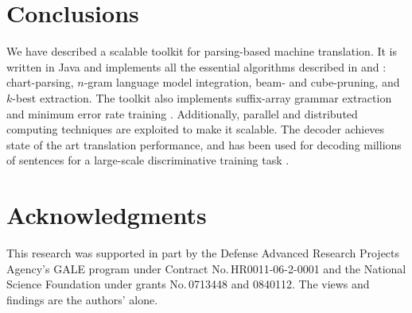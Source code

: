 \documentclass[11pt]{article}
\begin{document}
\section{Conclusions}
We have described a scalable toolkit for parsing-based machine translation. It is written in Java and implements all the essential algorithms described in  and : chart-parsing, $n$-gram language model integration, beam- and cube-pruning, and $k$-best extraction.
The toolkit also implements suffix-array grammar extraction \cite{Lopez2007} and minimum error rate training \cite{Och2003c}. Additionally, parallel and distributed computing techniques are exploited to make it scalable. The decoder achieves state of the art translation performance, and has been used for decoding millions of sentences for a large-scale discriminative training task \cite{Li2008}.





\section*{Acknowledgments}
This research was supported in part by the Defense Advanced Research Projects Agency's GALE program under Contract No.\,HR0011-06-2-0001 and the National Science Foundation under grants No.\,0713448 and 0840112. The views and findings are the authors' alone.




\end{document}
